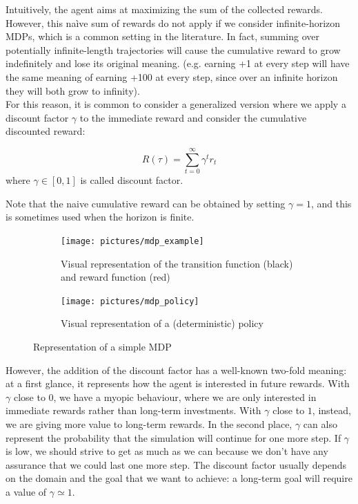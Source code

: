 Intuitively, the agent aims at maximizing the sum of the collected rewards. However, this na\`ive sum of rewards do not apply if we consider infinite-horizon MDPs, which is a common setting in the literature. In fact, summing over potentially infinite-length trajectories will cause the cumulative reward to grow indefinitely and lose its original meaning. (e.g. earning +1 at every step will have the same meaning of earning +100 at every step, since over an infinite horizon they will both grow to infinity).\\
For this reason, it is common to consider a generalized version where we apply a discount factor $\gamma$ to the immediate reward and consider the cumulative discounted reward:
\begin{definition}
\begin{equation*}
R(\tau) = \sum_{t=0}^{\infty} \gamma^t r_t
\end{equation*}
where $\gamma \in [0,1]$ is called discount factor. 
\end{definition}
Note that the naive cumulative reward can be obtained by setting $\gamma=1$, and this is sometimes used when the horizon is finite. 

\begin{figure}[t]
\centering
\begin{subfigure}[t]{0.495\textwidth}
\texttt{[image: pictures/mdp\_example]}
\caption{Visual representation of the transition function (black) and reward function (red)}
\end{subfigure}
\hfill
\begin{subfigure}[t]{0.495\textwidth}
\texttt{[image: pictures/mdp\_policy]}
\caption{Visual representation of a (deterministic) policy}
\end{subfigure}
\caption{Representation of a simple MDP} \label{fig:mdp-example}
\end{figure}

However, the addition of the discount factor has a well-known two-fold meaning: at a first glance, it represents how the agent is interested in future rewards. With $\gamma$ close to $0$, we have a myopic behaviour, where we are only interested in immediate rewards rather than long-term investments. With $\gamma$ close to $1$, instead, we are giving more value to long-term rewards. In the second place, $\gamma$ can also represent the probability that the simulation will continue for one more step. If $\gamma$ is low, we should strive to get as much as we can because we don't have any assurance that we could last one more step.
The discount factor usually depends on the domain and the goal that we want to achieve: a long-term goal will require a value of $\gamma \simeq 1$.


